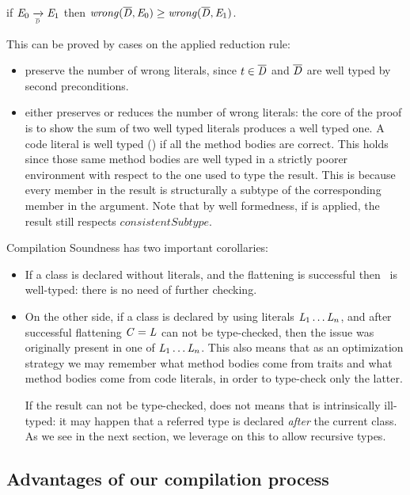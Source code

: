 \begin{Theorem}

if $\mE_0 \xrightarrow[\smallDs]{} \mE_1$
then $\mathit{wrong}(\overline{\mathit{D}},\mathit{E}_0)\geq\mathit{wrong}(\overline{\mathit{D}},\mathit{E}_1)$.
\end{Theorem}
This can be proved by cases on the applied reduction rule:
\begin{itemize}
\item
{} preserve the number of wrong literals,
since $t \in \overline{\mathit{D}}$ and $\overline{\mathit{D}}$ are well typed by  second preconditions.
\item {} either preserves or reduces the number of
wrong literals:
the core of the proof is to show the sum of two well typed literals produces a well typed one.
A code literal is well typed () if all the method bodies are correct.
This holds since those same method bodies
are well typed in a strictly poorer environment with respect to the one used to type the result.
This is because every member in the result
is structurally a subtype of
the corresponding member in the argument.
Note that by well formedness, if 
is applied, the result still respects 
$\mathit{consistentSubtype}$.
\end{itemize}
\noindent 
Compilation Soundness has two important corollaries:
\begin{itemize}
\item If a class is declared without literals,
and the flattening is successful then \mC\ is well-typed: there is no need of further checking.
\item On the other side, if a class is declared by using literals $\mathit{L}_1\ldots\mathit{L}_n$, and after successful flattening $\mathit{C} = \mathit{L}$ can not be type-checked,
then the issue was originally present in one of $\mathit{L}_1\ldots\mathit{L}_n$.
This also means that as an optimization strategy
 we may remember what method bodies come from traits and what method bodies come from code literals, in order to type-check only the latter.

If the result can not be type-checked, does not means
that is intrinsically ill-typed: it may happen that a 
referred type is declared \emph{after} the current class. 
As we see in the next section, we leverage on this 
to allow recursive types.
 \end{itemize}





\saveSpace
\subsection{Advantages of our compilation process}
\saveSpace

